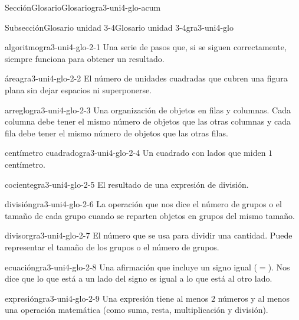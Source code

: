 \documentclass[oneside,10pt,]{article}
\begin{document}
\begin{sectionptx}{Sección}{Glosario}{}{Glosario}{}{}{gra3-uni4-glo-acum}
%
%
\typeout{************************************************}
\typeout{************************************************}
%
\begin{subsectionptx}{Subsección}{Glosario unidad 3-4}{}{Glosario unidad 3-4}{}{}{gra3-uni4-glo}
%
\begin{descriptionlist}
\begin{dlimedium}{algoritmo}{gra3-uni4-glo-2-1}%
Una serie de pasos que, si se siguen correctamente, siempre funciona para obtener un resultado.%
\end{dlimedium}%
\begin{dlimedium}{área}{gra3-uni4-glo-2-2}%
El número de unidades cuadradas que cubren una figura plana sin dejar espacios ni superponerse.%
\end{dlimedium}%
\begin{dlimedium}{arreglo}{gra3-uni4-glo-2-3}%
Una organización de objetos en filas y columnas. Cada columna debe tener el mismo número de objetos que las otras columnas y cada fila debe tener el mismo número de objetos que las otras filas.%
\end{dlimedium}%
\begin{dlimedium}{centímetro cuadrado}{gra3-uni4-glo-2-4}%
Un cuadrado con lados que miden \(1\) centímetro.%
\end{dlimedium}%
\begin{dlimedium}{cociente}{gra3-uni4-glo-2-5}%
El resultado de una expresión de división.%
\end{dlimedium}%
\begin{dlimedium}{división}{gra3-uni4-glo-2-6}%
La operación que nos dice el número de grupos o el tamaño de cada grupo cuando se reparten objetos en grupos del mismo tamaño.%
\end{dlimedium}%
\begin{dlimedium}{divisor}{gra3-uni4-glo-2-7}%
El número que se usa para dividir una cantidad. Puede representar el tamaño de los grupos o el número de grupos.%
\end{dlimedium}%
\begin{dlimedium}{ecuación}{gra3-uni4-glo-2-8}%
Una afirmación que incluye un signo igual (\(=\)). Nos dice que lo que está a un lado del signo es igual a lo que está al otro lado.%
\end{dlimedium}%
\begin{dlimedium}{expresión}{gra3-uni4-glo-2-9}%
Una expresión tiene al menos \(2\) números y al menos una operación matemática (como suma, resta, multiplicación y división).%

\end{dlimedium}
\end{descriptionlist}
\end{subsectionptx}
\end{sectionptx}
\end{document}
